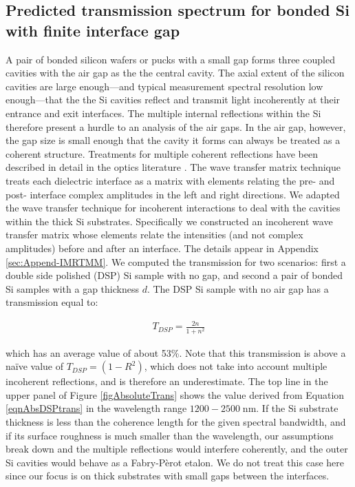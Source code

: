 \documentclass[osajnl,preprint,showpacs,superscriptaddress,12pt]{revtex4-1} %
\begin{document}
\subsection{Predicted transmission spectrum for bonded Si with finite interface gap}
\label{secTheory}
A pair of bonded silicon wafers or pucks with a small gap forms three coupled cavities with the air gap as the the central cavity.  The axial extent of the silicon cavities are large enough---and typical measurement spectral resolution low enough---that the the Si cavities reflect and transmit light incoherently at their entrance and exit interfaces.  The multiple internal reflections within the Si therefore present a hurdle to an analysis of the air gaps.  In the air gap, however, the gap size is small enough that the cavity it forms can always be treated as a coherent structure.  Treatments for multiple coherent reflections have been described in detail in the optics literature \cite{2007fuph.book.....S}.  The wave transfer matrix technique treats each dielectric interface as a matrix with elements relating the pre- and post- interface complex amplitudes in the left and right directions.  We adapted the wave transfer technique for incoherent interactions \cite{2002ApOpt..41.3978K} to deal with the cavities within the thick Si substrates.  Specifically we constructed an incoherent wave transfer matrix whose elements relate the intensities (and not complex amplitudes) before and after an interface.  The details appear in Appendix \ref{sec:Append-IMRTMM}.  We computed the transmission for two scenarios: first a double side polished (DSP) Si sample with no gap, and second a pair of bonded Si samples with a gap thickness $d$.  The DSP Si sample with no air gap has a transmission equal to:

\begin{eqnarray}
T_{DSP} = \frac{2n}{1+n^2} \label{eqnAbsDSPtrans}
\end{eqnarray}

which has an average value of about 53\%.  Note that this transmission is above a na\"ive value of $T_{DSP}=(1-R^2)$, which does not take into account multiple incoherent reflections, and is therefore an underestimate.  The top line in the upper panel of Figure \ref{figAbsoluteTrans} shows the value derived from Equation \ref{eqnAbsDSPtrans} in the wavelength range $1200-2500\;$nm.  If the Si substrate thickness is less than the coherence length for the given spectral bandwidth, and if its surface roughness is much smaller than the wavelength, our assumptions break down and the multiple reflections would interfere coherently, and the outer Si cavities would behave as a Fabry-P\`erot etalon.  We do not treat this case here since our focus is on thick substrates with small gaps between the interfaces.
\end{document}
